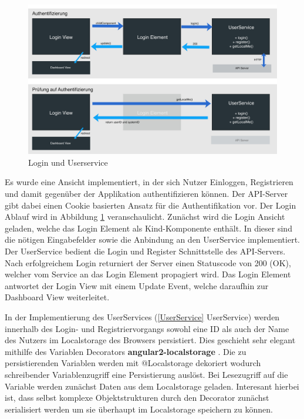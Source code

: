 \begin{figure}[h!p!]
 \centering
 \includegraphics[width=\linewidth]{kapitel4/login.jpg}
 \caption{Login und Userservice}
 \label{kapitel4/login}
\end{figure}
\vspace{0.3cm}

Es wurde eine Ansicht implementiert, in der sich Nutzer Einloggen, Registrieren und damit gegenüber der Applikation authentifizieren können.
Der \ac{API}-Server gibt dabei einen Cookie basierten Ansatz für die Authentifikation vor. Der Login Ablauf wird in Abbildung \ref{kapitel4/login} veranschaulicht.
Zunächst wird die Login Ansicht geladen, welche das Login Element als Kind-Komponente enthält.
In dieser sind die nötigen Eingabefelder sowie die Anbindung an den UserService implementiert.
Der UserService bedient die Login und Register Schnittstelle des \ac{API}-Servers.
Nach erfolgreichem Login returniert der Server einen Statuscode von 200 (OK), welcher vom Service an das Login Element propagiert wird.
Das Login Element antwortet der Login View mit einem Update Event, welche daraufhin zur Dashboard View weiterleitet.

In der Implementierung des UserServices (\ref{UserService} UserService) werden innerhalb des Login- und Registriervorgangs
sowohl eine ID als auch der Name des Nutzers im Localstorage des Browsers persistiert.
Dies geschieht sehr elegant mithilfe des Variablen Decorators \textbf{angular2-localstorage} \cite{marcj95:online}.
Die zu persistierenden Variablen werden mit @Localstorage dekoriert wodurch schreibender Variablenzugriff eine Persistierung auslöst.
Bei Lesezugriff auf die Variable werden zunächst Daten aus dem Localstorage geladen.
Interesant hierbei ist, dass selbst komplexe Objektstrukturen durch den Decorator zunächst serialisiert werden um sie überhaupt im Localstorage speichern zu können.

